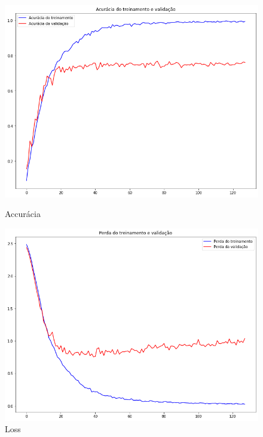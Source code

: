 \documentclass[12pt]{article}
\begin{document}
\begin{figure}[!htb]
  \begin{minipage}{.47\textwidth}
    \centering
    \includegraphics[width=1.1\linewidth]{experiments/default_noaug_128/accuracy.png}
    \caption{Accurácia}\label{fig:experiment_default_noaug_128_accuracy}
  \end{minipage}\hfill
  \begin{minipage}{.47\textwidth}
    \centering
    \includegraphics[width=1.1\linewidth]{experiments/default_noaug_128/loss.png}
    \caption{Loss}\label{fig:experiment_default_noaug_128_loss}
  \end{minipage}
\end{figure}
\end{document}
